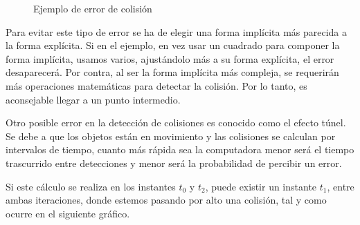 \begin{figure}[!h]
	\centering	

	\caption{Ejemplo de error de colisión}
\end{figure}

Para evitar este tipo de error se ha de elegir una forma implícita más parecida a la forma explícita. Si en el ejemplo, en vez usar un cuadrado para componer la forma implícita, usamos varios, ajustándolo más a su forma explícita, el error desaparecerá. Por contra, al ser la forma implícita más compleja, se requerirán más operaciones matemáticas para detectar la colisión. Por lo tanto, es aconsejable llegar a un punto intermedio.
\newline

Otro posible error en la detección de colisiones es conocido como el efecto túnel. Se debe a que los objetos están en movimiento y las colisiones se calculan por intervalos de tiempo, cuanto más rápida sea la computadora menor será el tiempo trascurrido entre detecciones y menor será la probabilidad de percibir un error. 
\newline

Si este cálculo se realiza en los instantes $t_0$ y $t_2$, puede existir un instante $t_1$, entre ambas iteraciones, donde estemos pasando por alto una colisión, tal y como ocurre en el siguiente gráfico.

